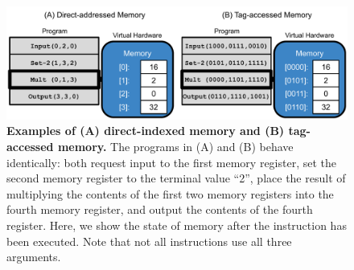 \begin{figure}
  \includegraphics[width=1.0\columnwidth]{chapters/06-tag-access-memory/media/memory-access-overview.pdf}
  \caption{\small 
  \textbf{Examples of (A) direct-indexed memory and (B) tag-accessed memory. }
  The programs in (A) and (B) behave identically: both request input to the first memory register, set the second memory register to the terminal value ``2'', place the result of multiplying the contents of the first two memory registers into the fourth memory register, and output the contents of the fourth register.
  Here, we show the state of memory after the  instruction has been executed. 
  Note that not all instructions use all three arguments.
  }
  \label{chapter:tag-accessed-memory:fig:memory-access-overview}
\end{figure}